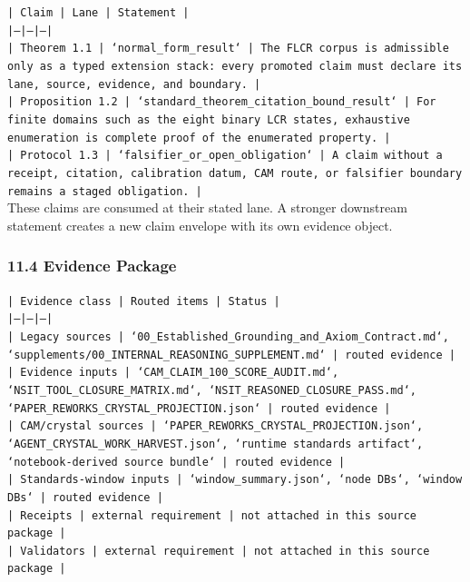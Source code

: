 \documentclass[11pt]{article}
\begin{document}
\noindent\texttt{| Claim | Lane | Statement |}\\
\noindent\texttt{|---|---|---|}\\
\noindent\texttt{| Theorem 1.1 | `normal\_form\_result` | The FLCR corpus is admissible only as a typed extension stack: every promoted claim must declare its lane, source, evidence, and boundary. |}\\
\noindent\texttt{| Proposition 1.2 | `standard\_theorem\_citation\_bound\_result` | For finite domains such as the eight binary LCR states, exhaustive enumeration is complete proof of the enumerated property. |}\\
\noindent\texttt{| Protocol 1.3 | `falsifier\_or\_open\_obligation` | A claim without a receipt, citation, calibration datum, CAM route, or falsifier boundary remains a staged obligation. |}\\

These claims are consumed at their stated lane. A stronger downstream statement
creates a new claim envelope with its own evidence object.

\subsubsection*{11.4 Evidence Package}

\noindent\texttt{| Evidence class | Routed items | Status |}\\
\noindent\texttt{|---|---|---|}\\
\noindent\texttt{| Legacy sources | `00\_Established\_Grounding\_and\_Axiom\_Contract.md`, `supplements/00\_INTERNAL\_REASONING\_SUPPLEMENT.md` | routed evidence |}\\
\noindent\texttt{| Evidence inputs | `CAM\_CLAIM\_100\_SCORE\_AUDIT.md`, `NSIT\_TOOL\_CLOSURE\_MATRIX.md`, `NSIT\_REASONED\_CLOSURE\_PASS.md`, `PAPER\_REWORKS\_CRYSTAL\_PROJECTION.json` | routed evidence |}\\
\noindent\texttt{| CAM/crystal sources | `PAPER\_REWORKS\_CRYSTAL\_PROJECTION.json`, `AGENT\_CRYSTAL\_WORK\_HARVEST.json`, `runtime standards artifact`, `notebook-derived source bundle` | routed evidence |}\\
\noindent\texttt{| Standards-window inputs | `window\_summary.json`, `node DBs`, `window DBs` | routed evidence |}\\
\noindent\texttt{| Receipts | external requirement | not attached in this source package |}\\
\noindent\texttt{| Validators | external requirement | not attached in this source package |}\\
\end{document}
